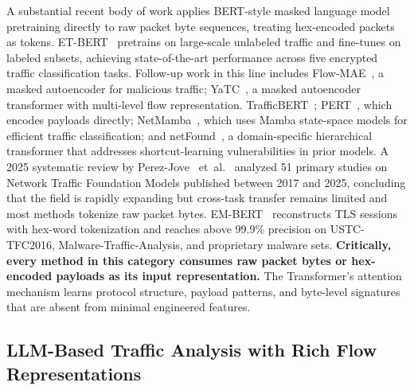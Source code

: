 \documentclass[conference]{IEEEtran}
\begin{document}
A substantial recent body of work applies BERT-style masked language model pretraining directly to raw packet byte sequences, treating hex-encoded packets as tokens. ET-BERT~\cite{lin2022etbert} pretrains on large-scale unlabeled traffic and fine-tunes on labeled subsets, achieving state-of-the-art performance across five encrypted traffic classification tasks. Follow-up work in this line includes Flow-MAE~\cite{hang2023flowmae}, a masked autoencoder for malicious traffic; YaTC~\cite{zhao2023yatc}, a masked autoencoder transformer with multi-level flow representation. TrafficBERT~\cite{shi2023trafficbert}; PERT~\cite{he2020pert}, which encodes payloads directly; NetMamba~\cite{wang2024netmamba}, which uses Mamba state-space models for efficient traffic classification; and netFound~\cite{guthula2023netfound}, a domain-specific hierarchical transformer that addresses shortcut-learning vulnerabilities in prior models. A 2025 systematic review by Perez-Jove ~et~al.~\cite{perejove2026nftm} analyzed 51 primary studies on Network Traffic Foundation Models published between 2017 and 2025, concluding that the field is rapidly expanding but cross-task transfer remains limited and most methods tokenize raw packet bytes. EM-BERT~\cite{embert2024} reconstructs TLS sessions with hex-word tokenization and reaches above 99.9\% precision on USTC-TFC2016, Malware-Traffic-Analysis, and proprietary malware sets. \textbf{Critically, every method in this category consumes raw packet bytes or hex-encoded payloads as its input representation.} The Transformer's attention mechanism learns protocol structure, payload patterns, and byte-level signatures that are absent from minimal engineered features.

\subsection{LLM-Based Traffic Analysis with Rich Flow Representations}
\end{document}
